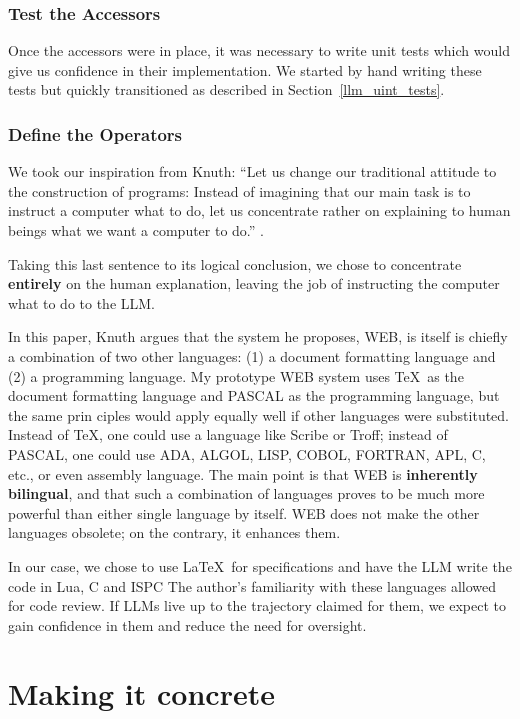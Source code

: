\documentclass[letterpaper,12pt]{article}
\begin{document}
{  \ee

\subsubsection{Test the Accessors}
Once the accessors were in place, it was necessary to write unit tests which
would give us confidence in their implementation. We started by hand writing
these tests but quickly transitioned as described in
Section~\ref{llm_uint_tests}.

\subsubsection{Define the Operators}

We took our inspiration from Knuth: ``Let us change our traditional attitude to the construction of programs: 
Instead of imagining that our main task is to 
instruct a computer what to do, let us concentrate rather on explaining
to human beings what we want a computer to do.'' \cite{knuth1984literate}.

Taking this last sentence to its logical conclusion, we chose to 
concentrate {\bf entirely} on the human explanation, 
leaving the job of instructing the computer what to do to the LLM.

In this paper, Knuth argues that the system he proposes, WEB, is 
itself is chiefly a combination of two other languages: (1) a document formatting language and (2) a
programming language. My prototype WEB system uses
\TeX\ as the document formatting language and PASCAL
as the programming language, but the same prin ciples would apply equally well if other languages were
substituted. Instead of \TeX, one could use a language
like Scribe or Troﬀ; instead of PASCAL, one could use
ADA, ALGOL, LISP, COBOL, FORTRAN, APL, C, etc.,
or even assembly language. The main point is that WEB
is {\bf inherently bilingual}, and that such a combination of
languages proves to be much more powerful than either
single language by itself. WEB does not make the other
languages obsolete; on the contrary, it enhances them.

In our case, we chose to use \LaTeX\ for specifications 
and have the LLM write the code in Lua, C and ISPC \cite{ISPC}
The author's familiarity with these languages allowed for code review.
If LLMs live up to the trajectory claimed for them, 
we expect to gain confidence in them and reduce the need for oversight.

\section{Making it concrete}

}
\end{document}
